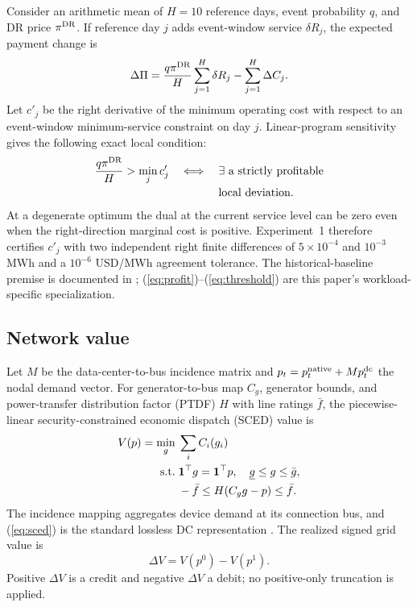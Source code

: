 \documentclass[10pt,journal]{IEEEtran}
\begin{document}
Consider an arithmetic mean of $H=10$ reference days, event probability $q$,
and DR price $\pi^{\rm DR}$. If reference day $j$ adds event-window service
$\delta R_j$, the expected payment change is
\begin{equation}
 \Delta\Pi=\frac{q\pi^{\rm DR}}{H}\sum_{j=1}^{H}\delta R_j
 -\sum_{j=1}^{H}\Delta C_j .
 \label{eq:profit}
\end{equation}
Let $c'_j$ be the right derivative of the minimum operating cost with respect
to an event-window minimum-service constraint on day $j$. Linear-program
sensitivity \cite{boyd2004convex} gives the following exact local condition:
\begin{equation}
\begin{aligned}
 \frac{q\pi^{\rm DR}}{H}>\min_j c'_j
 \quad\Longleftrightarrow\quad {}&
 \exists\ \text{a strictly profitable}\\[-2pt]
 &\text{local deviation}.
\end{aligned}
 \label{eq:threshold}
\end{equation}
At a degenerate optimum the dual at the current service level can be zero
even when the right-direction marginal cost is positive. Experiment~1
therefore certifies $c'_j$ with two independent right finite differences of
$5\times10^{-4}$ and $10^{-3}$ MWh and a $10^{-6}$ USD/MWh agreement
tolerance.
The historical-baseline premise is documented in
\cite{wang2022baseline}; (\ref{eq:profit})--(\ref{eq:threshold})
are this paper's workload-specific specialization.

\subsection{Network value}

Let $M$ be the data-center-to-bus incidence matrix and
$p_t=p_t^{\rm native}+Mp_t^{\rm dc}$ the nodal demand vector. For
generator-to-bus map $C_g$, generator bounds, and power-transfer distribution
factor (PTDF) $H$ with line ratings $\bar f$, the
piecewise-linear security-constrained economic dispatch (SCED) value is
\begin{align}
 V(p)=\min_g\;&\sum_i C_i(g_i) \label{eq:sced}\\
 {\rm s.t.}\;&\mathbf1^\top g=\mathbf1^\top p,\quad
 \underline g\leq g\leq\bar g,\nonumber\\
 &-\bar f\leq H(C_gg-p)\leq\bar f.\nonumber
\end{align}
The incidence mapping aggregates device demand at its connection bus, and
(\ref{eq:sced}) is the standard lossless DC representation
\cite{stott2009dc,zimmerman2011matpower}. The realized signed grid value is
\begin{equation}
 \Delta V=V(p^0)-V(p^1). \label{eq:value}
\end{equation}
Positive $\Delta V$ is a credit and negative $\Delta V$ a debit; no
positive-only truncation is applied.
\end{document}
